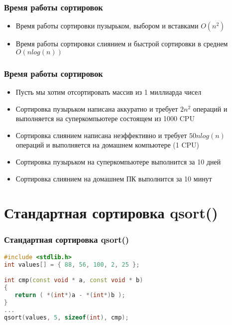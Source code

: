 \documentclass[12pt,pdf,hyperref={unicode}]{beamer}
\begin{document}
\begin{frame}[fragile]
\frametitle{Время работы сортировок} 
\begin{itemize}
\item Время работы сортировки пузырьком, выбором и вставками $O(n^2)$ \\
\item Время работы сортировки слиянием и быстрой сортировки в среднем $O(n log(n))$ \\
\end{itemize}
\end{frame}

\begin{frame}[fragile]
\frametitle{Время работы сортировок} 
\begin{itemize}
\item Пусть мы хотим отсортировать массив из 1 миллиарда чисел
\item Сортировка пузырьком написана аккуратно и требует $2n^2$ операций и выполняется на суперкомпьютере состоящем из 1000 CPU
\item Сортировка слиянием написана неэффективно и требует $50 n log(n)$ операций и выполняется на домашнем компьютере (1 CPU)
\item Сортировка пузырьком на суперкомпьютере выполнится за 10 дней \\
\item Сортировка слиянием на домашнем ПК выполнится за 10 минут \\
\end{itemize}
\end{frame}




\section{Стандартная сортировка qsort()}


\begin{frame}[fragile]
\frametitle{Стандартная сортировка qsort()} 
\begin{lstlisting}[language=C++,basicstyle=\ttfamily,keywordstyle=\color{blue}]
#include <stdlib.h>
int values[] = { 88, 56, 100, 2, 25 };

int cmp(const void * a, const void * b)
{
   return ( *(int*)a - *(int*)b );
}
...
qsort(values, 5, sizeof(int), cmp);

\end{lstlisting}
\end{frame}
\end{document}
